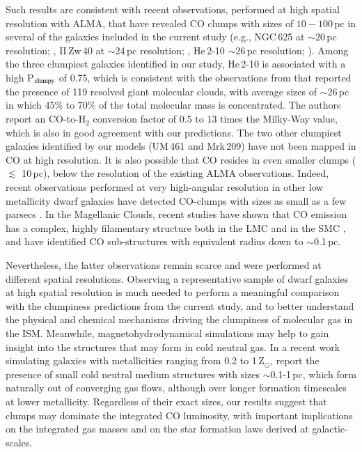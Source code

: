 \documentclass{aa}
\begin{document}
Such results are consistent with recent observations, performed at high spatial resolution with ALMA, that have revealed CO clumps with sizes of $10-100$\,pc in several of the galaxies included in the current study (e.g., NGC\,625 at $\sim$20\,pc resolution; \citealt{Imara_ngc625_2020}, II\,Zw\,40 at $\sim$24\,pc resolution; \citealt{Kepley_2016}, He\,2-10 $\sim$26\,pc resolution; \citealt{Imara_faesi_2019}). 
Among the three clumpiest galaxies identified in our study, He\,2-10 is associated with a high P$_{\rm clumpy}$ of 0.75, which is consistent with the observations from \cite{Imara_faesi_2019} that reported the presence of 119 resolved giant molecular clouds, with average sizes of $\sim$26\,pc in which 45\% to 70\% of the total molecular mass is concentrated. The authors report an CO-to-H$_2$ conversion factor of $0.5$ to $13$ times the Milky-Way value, which is also in good agreement with our predictions. The two other clumpiest galaxies identified by our models (UM\,461 and Mrk\,209) have not been mapped in CO at high resolution. It is also possible that CO resides in even smaller clumps ($\lesssim$ 10\,pc), below the resolution of the existing ALMA observations. Indeed, recent observations performed at very high-angular resolution in other low metallicity dwarf galaxies have detected CO-clumps with sizes as small as a few parsecs \citep[e.g.,][]{Oey_2017, Shi_2020, Schruba_2017, Rubio_2015, Archer_2022}. In the Magellanic Clouds, recent studies have shown that CO emission has a complex, highly filamentary structure both in the LMC \citep{Wong_2019, Wong_2022} and in the SMC \citep{Ohno_2023}, and have identified CO sub-structures with equivalent radius down to $\sim$0.1\,pc.

Nevertheless, the latter observations remain scarce and were performed at different spatial resolutions. Observing a representative sample of dwarf galaxies at high spatial resolution is much needed to perform a meaningful comparison with the clumpiness predictions from the current study, and to better understand the physical and chemical mechanisms driving the clumpiness of molecular gas in the ISM. Meanwhile, magnetohydrodynamical simulations may help to gain insight into the structures that may form in cold neutral gas. In a recent work simulating galaxies with metallicities ranging from 0.2 to 1\,Z$_{\odot}$, \cite{Kobayashi_2023} report the presence of small cold neutral medium structures with sizes $\sim$0.1-1\,pc, which form naturally out of converging gas flows, although over longer formation timescales at lower metallicity. Regardless of their exact sizes, our results suggest that clumps may dominate the integrated CO luminosity, with important implications on the integrated gas masses and on the star formation laws derived at galactic-scales.
\end{document}
